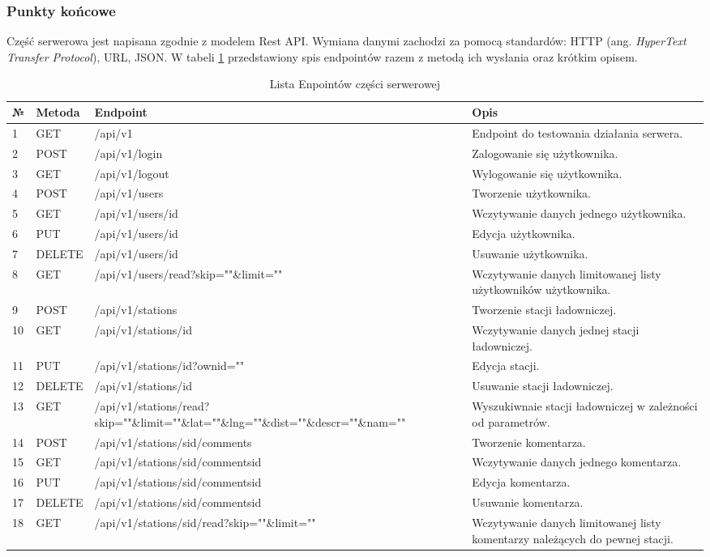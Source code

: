 \subsubsection{Punkty końcowe}
Część serwerowa jest napisana zgodnie z modelem Rest API. Wymiana danymi zachodzi za pomocą standardów: HTTP (ang. \textit{HyperText Transfer Protocol}), URL, JSON.
W tabeli \ref{tab:endpoints} przedstawiony spis endpointów razem z metodą ich wysłania oraz krótkim opisem.
\begin{table}[htb] \small
    \caption{Lista Enpointów części serwerowej}
    \label{tab:endpoints}
    \begin{tabular}{| m{0.5cm} | m{2cm} | m{6cm} | m{6cm} |}
    \hline
    № & Metoda & Endpoint & Opis \\
    \hline
    1 & GET & /api/v1 & Endpoint do testowania działania serwera. \\
    \hline
    2 & POST & /api/v1/login & Zalogowanie się użytkownika. \\
    \hline
    3 & GET & /api/v1/logout & Wylogowanie się użytkownika. \\
    \hline
    4 & POST & /api/v1/users & Tworzenie użytkownika. \\
    \hline
    5 & GET & /api/v1/users/{id} & Wczytywanie danych jednego użytkownika. \\
    \hline
    6 & PUT & /api/v1/users/{id} & Edycja użytkownika. \\
    \hline
    7 & DELETE & /api/v1/users/{id} & Usuwanie użytkownika. \\
    \hline
    8 & GET & /api/v1/users/read?skip=""\&limit="" & Wczytywanie danych limitowanej listy użytkowników użytkownika. \\
    \hline
    9 & POST & /api/v1/stations & Tworzenie stacji ładowniczej. \\
    \hline
    10 & GET & /api/v1/stations/{id} & Wczytywanie danych jednej stacji ładowniczej. \\
    \hline
    11 & PUT & /api/v1/stations/{id}?ownid="" & Edycja stacji. \\
    \hline
    12 & DELETE & /api/v1/stations/{id} & Usuwanie stacji ładowniczej. \\
    \hline
    13 & GET & /api/v1/stations/read?skip=""\&limit=""\&lat=""\&lng=""\&dist=""\&descr=""\&nam="" & Wyszukiwnaie stacji ładowniczej w zależności od parametrów. \\
    \hline
    14 & POST & /api/v1/stations/{sid}/comments & Tworzenie komentarza. \\
    \hline
    15 & GET & /api/v1/stations/{sid}/comments{id} & Wczytywanie danych jednego komentarza. \\
    \hline
    16 & PUT & /api/v1/stations/{sid}/comments{id} & Edycja komentarza. \\
    \hline
    17 & DELETE & /api/v1/stations/{sid}/comments{id} & Usuwanie komentarza. \\
    \hline
    18 & GET & /api/v1/stations/{sid}/read?skip=""\&limit="" & Wczytywanie danych limitowanej listy komentarzy należących do pewnej stacji. \\
    \hline
    \end{tabular}
\end{table}
